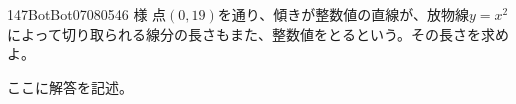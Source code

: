 \begin{thm}{147}{}{BotBot07080546 様}
 点$(0,19)$を通り、傾きが整数値の直線が、放物線$y=x^2$によって切り取られる線分の長さもまた、整数値をとるという。その長さを求めよ。
\end{thm}

ここに解答を記述。